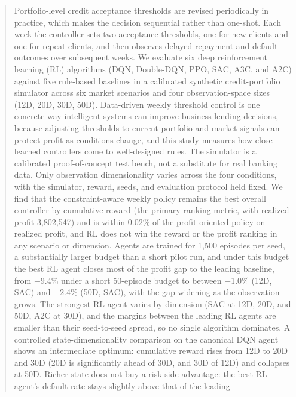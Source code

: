 \documentclass[preprint,review,authoryear,12pt]{elsarticle}
\begin{document}
\begin{frontmatter}
    \begin{abstract}
        Portfolio-level credit acceptance thresholds are revised periodically in practice,
        which makes the decision sequential rather than one-shot. Each week the controller
        sets two acceptance thresholds, one for new clients and one for repeat clients, and
        then observes delayed repayment and default outcomes over subsequent weeks. We
        evaluate six deep reinforcement learning (RL) algorithms (DQN, Double-DQN, PPO, SAC,
        A3C, and A2C) against five rule-based baselines in a calibrated synthetic
        credit-portfolio simulator across six market scenarios and four observation-space
        sizes (12D, 20D, 30D, 50D). Data-driven weekly threshold control is one concrete way
        intelligent systems can improve business lending decisions, because adjusting
        thresholds to current portfolio and market signals can protect profit as conditions
        change, and this study measures how close learned controllers come to well-designed
        rules. The simulator is a calibrated proof-of-concept test bench, not a substitute for
        real banking data. Only observation dimensionality varies across the four conditions,
        with the simulator, reward, seeds, and evaluation protocol held fixed. We find that the
        constraint-aware weekly policy remains the best overall controller by cumulative
        reward (the primary ranking metric, with realized profit 3{,}802{,}547) and is within
        0.02\% of the profit-oriented policy on realized profit, and RL does
        not win the reward or the profit ranking in any scenario or dimension. Agents are
        trained for 1{,}500 episodes per seed, a substantially larger budget than a short
        pilot run, and under this budget the best RL agent closes most of the profit gap to
        the leading baseline, from $-$9.4\% under a short 50-episode budget to between
        $-$1.0\% (12D, SAC) and $-$2.4\% (50D, SAC), with the gap widening as the observation
        grows. The strongest RL agent varies by dimension (SAC at 12D, 20D, and 50D, A2C at
        30D), and the margins between the leading RL agents are smaller than their
        seed-to-seed spread, so no single algorithm dominates. A controlled
        state-dimensionality comparison on the canonical DQN agent shows an intermediate
        optimum: cumulative reward rises from 12D to 20D and 30D (20D is significantly ahead
        of 30D, and 30D of 12D) and collapses at 50D. Richer state does not buy a risk-side
        advantage: the best RL agent's default rate stays slightly above that of the leading

\end{abstract}
\end{frontmatter}
\end{document}
